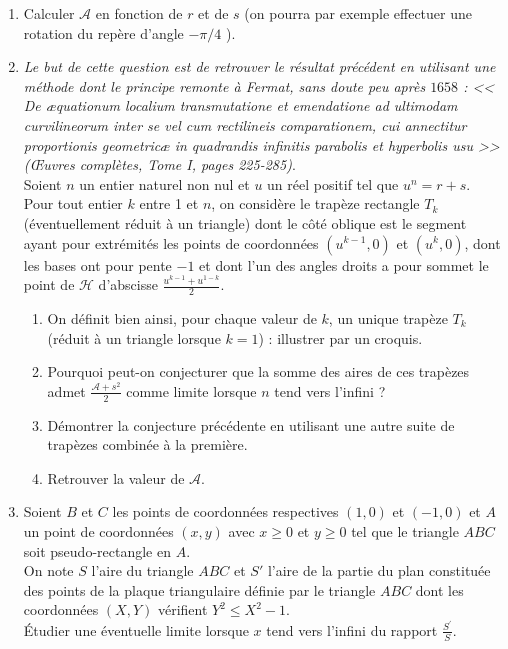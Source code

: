 \documentclass[landscape,twocolumn,leqno,a4paper,10pt]{report} %
\newcommand\n{\noindent}
\renewcommand{\geq}{\geqslant}
\renewcommand{\leq}{\leqslant}
\begin{document}
\begin{enumerate}
	\item Calculer $\mathcal{A}$ en fonction de $r$ et de $s$ (on pourra par exemple effectuer une rotation du repère d'angle $-\pi / 4$ ). 
	\item \textit{Le but de cette question est de retrouver le résultat précédent en utilisant une méthode dont le principe remonte à Fermat, sans doute peu après $1658$ : << De æquationum localium transmutatione et emendatione ad ultimodam curvilineorum inter se vel cum rectilineis comparationem, cui annectitur proportionis geometricæ in quadrandis infinitis parabolis et hyperbolis usu >> (Œuvres complètes, Tome I, pages 225-285)}.\\
	
	\n Soient $n$ un entier naturel non nul et $u$ un réel positif tel que $u^{n}=r+s$. Pour tout entier $k$ entre 1 et $n$, on considère le trapèze rectangle $T_{k}$ (éventuellement réduit à un triangle) dont le côté oblique est le segment ayant pour extrémités les points de coordonnées $\left(u^{k-1}, 0\right)$ et $\left(u^{k}, 0\right)$, dont les bases ont pour pente $-1$ et dont l'un des angles droits a pour sommet le point de $\mathcal{H}$ d'abscisse $\frac{u^{k-1}+u^{1-k}}{2}$.
	\begin{enumerate}
		\item On définit bien ainsi, pour chaque valeur de $k$, un unique trapèze $T_{k}$ (réduit à un triangle lorsque $k=1$) : illustrer par un croquis.
		\item Pourquoi peut-on conjecturer que la somme des aires de ces trapèzes admet $\frac{\mathcal{A}+s^{2}}{2}$ comme limite lorsque $n$ tend vers l'infini ?
		\item Démontrer la conjecture précédente en utilisant une autre suite de trapèzes combinée à la première.
		\item Retrouver la valeur de $\mathcal{A}$.
	\end{enumerate}
	\item Soient $B$ et $C$ les points de coordonnées respectives $(1,0)$ et $(-1,0)$ et $A$ un point de coordonnées $(x, y)$ avec $x \geq 0$ et $y \geq 0$ tel que le triangle $A B C$ soit pseudo-rectangle en $A$.\\
	
	\n On note $S$ l'aire du triangle $A B C$ et $S'$ l'aire de la partie du plan constituée des points de la plaque triangulaire définie par le triangle $A B C$ dont les coordonnées $(X, Y)$ vérifient $Y^{2} \leq X^{2}-1$.\\
	
	\n Étudier une éventuelle limite lorsque $x$ tend vers l'infini du rapport $\frac{S^{\prime}}{S}$.
\end{enumerate}
\end{document}
